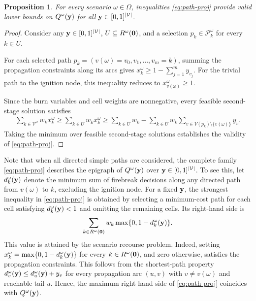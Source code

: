 \documentclass{itor}
\newtheorem{proposition}{Proposition}
\begin{document}
\begin{proposition}
\label{prop:path}
For every scenario $\omega \in \Omega$, inequalities
\eqref{eq:path-proj} provide valid lower bounds on
$Q^\omega(\vb{y})$ for all
$\vb{y} \in [0,1]^{|\mathcal{V}|}$.
\end{proposition}

\begin{proof}
Consider any $\vb{y} \in [0,1]^{|\mathcal{V}|}$,
$U \subseteq R^\omega(\vb{0})$, and a selection
$p_k \in \mathcal{P}_k^\omega$ for every $k \in U$.

For each selected path
$p_k=(v(\omega)=v_0,v_1,\ldots,v_m=k)$,
summing the propagation constraints along its arcs gives $x_k^\omega \geq
1-\sum_{j=1}^{m}y_{v_j}$. For the trivial path to the ignition node, this
inequality reduces to $x_{v(\omega)}^\omega \geq 1$.

Since the burn variables and cell weights are nonnegative,
every feasible second-stage solution satisfies
\begin{align*}
\sum_{k \in \mathcal{V}^\omega}w_k x_k^\omega
\geq
\sum_{k \in U}w_k x_k^\omega
\nonumber
\geq
\sum_{k \in U}w_k
-
\sum_{k \in U}w_k
\sum_{v \in V(p_k)\setminus\{v(\omega)\}}y_v.
\end{align*}
Taking the minimum over feasible second-stage solutions
establishes the validity of \eqref{eq:path-proj}.
\end{proof}

Note that when all directed simple paths are considered, the complete family \eqref{eq:path-proj} describes the epigraph of $Q^\omega(\vb{y})$ over
$\vb{y} \in [0,1]^{|\mathcal{V}|}$.  To see this, let $d_k^\omega(\vb{y})$ denote the minimum
sum of firebreak decisions along any directed path from
$v(\omega)$ to $k$, excluding the ignition node.
For a fixed $\vb{y}$, the strongest inequality in
\eqref{eq:path-proj} is obtained by selecting a
minimum-cost path for each cell satisfying
$d_k^\omega(\vb{y})<1$ and omitting the remaining cells.
Its right-hand side is
\[
\sum_{k \in R^\omega(\vb{0})}
w_k\max\{0,1-d_k^\omega(\vb{y})\}.
\]
This value is attained by the scenario recourse problem.
Indeed, setting
$x_k^\omega=\max\{0,1-d_k^\omega(\vb{y})\}$
for every $k \in R^\omega(\vb{0})$, and zero otherwise,
satisfies the propagation constraints.
This follows from the shortest-path property
$d_v^\omega(\vb{y})\leq d_u^\omega(\vb{y})+y_v$
for every propagation arc $(u,v)$ with
$v\neq v(\omega)$ and reachable tail $u$.
Hence, the maximum right-hand side of
\eqref{eq:path-proj} coincides with
$Q^\omega(\vb{y})$.
\end{document}
